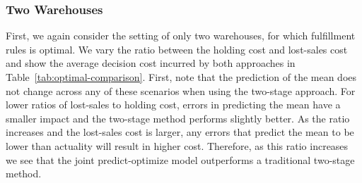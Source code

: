 \documentclass[poms,final,blindrev]{poms1_V1} %
\begin{document}

\subsubsection*{Two Warehouses} First, we again consider the setting of only two warehouses, for which fulfillment rules is optimal. We vary the ratio between the holding cost and lost-sales cost and show the average decision cost incurred by both approaches in Table~\ref{tab:optimal-comparison}.
First, note that the prediction of the mean does not change across any of these scenarios when using the two-stage approach. For lower ratios of lost-sales to holding cost, errors in predicting the mean have a smaller impact and the two-stage method performs slightly better. 
As the ratio increases and the lost-sales cost is larger, any errors that predict the mean to be lower than actuality will result in higher cost. Therefore, as this ratio increases we see that the joint predict-optimize model outperforms a traditional two-stage method. 


\end{document}
